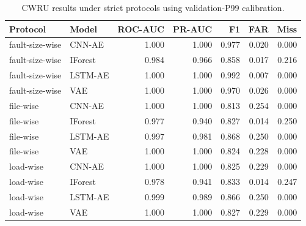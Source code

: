 \begin{table}[t]
\centering
\caption{CWRU results under strict protocols using validation-P99 calibration.}
\label{tab:cwru_strict}
\small
\begin{tabular}{llrrrrr}
\toprule
Protocol & Model & ROC-AUC & PR-AUC & F1 & FAR & Miss \\
\midrule
fault-size-wise & CNN-AE & 1.000 & 1.000 & 0.977 & 0.020 & 0.000 \\
fault-size-wise & IForest & 0.984 & 0.966 & 0.858 & 0.017 & 0.216 \\
fault-size-wise & LSTM-AE & 1.000 & 1.000 & 0.992 & 0.007 & 0.000 \\
fault-size-wise & VAE & 1.000 & 1.000 & 0.970 & 0.026 & 0.000 \\
file-wise & CNN-AE & 1.000 & 1.000 & 0.813 & 0.254 & 0.000 \\
file-wise & IForest & 0.977 & 0.940 & 0.827 & 0.014 & 0.250 \\
file-wise & LSTM-AE & 0.997 & 0.981 & 0.868 & 0.250 & 0.000 \\
file-wise & VAE & 1.000 & 1.000 & 0.824 & 0.228 & 0.000 \\
load-wise & CNN-AE & 1.000 & 1.000 & 0.825 & 0.229 & 0.000 \\
load-wise & IForest & 0.978 & 0.941 & 0.833 & 0.014 & 0.247 \\
load-wise & LSTM-AE & 0.999 & 0.989 & 0.866 & 0.250 & 0.000 \\
load-wise & VAE & 1.000 & 1.000 & 0.827 & 0.229 & 0.000 \\
\bottomrule
\end{tabular}
\end{table}